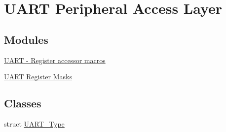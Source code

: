 \hypertarget{group__UART__Peripheral__Access__Layer}{}\section{U\+A\+RT Peripheral Access Layer}
\label{group__UART__Peripheral__Access__Layer}
\subsection*{Modules}
\begin{DoxyCompactItemize}
\item 
\hyperlink{group__UART__Register__Accessor__Macros}{U\+A\+R\+T -\/ Register accessor macros}
\item 
\hyperlink{group__UART__Register__Masks}{U\+A\+R\+T Register Masks}
\end{DoxyCompactItemize}
\subsection*{Classes}
\begin{DoxyCompactItemize}
\item 
struct \hyperlink{structUART__Type}{U\+A\+R\+T\+\_\+\+Type}
\end{DoxyCompactItemize}
